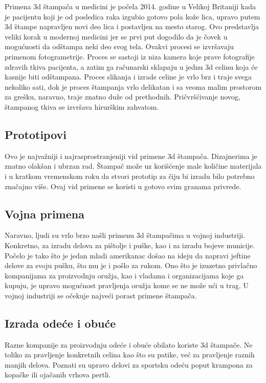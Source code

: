 \documentclass[a4paper]{article}
\begin{document}
{Primena 3d štampača u medicini je počela 2014. godine u Velikoj Britaniji kada je pacijentu koji je od posledica raka izgubio gotovo pola kože lica, upravo putem 3d štampe napravljen novi deo lica i postavljen na mesto starog. Ovo predstavlja veliki korak u modernoj medicini jer se prvi put dogodilo da je čovek u mogućnosti da odštampa neki deo svog tela. 
\bigbreak Ovakvi procesi se izvršavaju primenom fotogrametrije. Proces se sastoji iz niza kamera koje prave fotografije zdravih tkiva pacijenta, a zatim ga računarski sklapaju u jednu 3d celinu koja će kasnije biti odštampana. Proces slikanja i izrade celine je vrlo brz i traje svega nekoliko sati, dok je proces štampanja vrlo delikatan i sa veoma malim prostorom za grešku, naravno, traje znatno duže od prethodnih. Pričvršćivanje novog, štampanog tkiva se izvršava hirurškim zahvatom.

\subsection{Prototipovi}
\label{subsec:podnaslov7}

Ovo je najvažniji i najrasprostranjeniji vid primene 3d štampača. Dizajnerima je znatno olakšan i ubrzan rad. Štampač može uz korišćenje male količine materijala i u kratkom vremenskom roku da stvori prototip za čiju bi izradu bilo potrebno značajno više. Ovaj vid primene se koristi u gotovo svim granama privrede.

\subsection{Vojna primena}
\label{subsec:podnaslov8}

Naravno, ljudi su vrlo brzo našli primenu 3d štampačima u vojnoj industriji. Konkretno, za izradu delova za pištolje i puške, kao i za izradu bojeve municije. Počelo je tako što je jedan mladi amerikanac došao na ideju da napravi jeftine delove za svoju pušku, što mu je i pošlo za rukom. Ono što je izuzetno privlačno kompanijama za proizvodnju oružja, kao i vladama i organizacijama koje ga kupuju, je upravo mogućnost pravljenja oružja kome se ne može ući u trag. U vojnoj industriji se očekuje najveći porast primene štampača. 

\subsection{Izrada odeće i obuće}
\label{subsec:podnaslov9}

Razne kompanije za proizvodnju odeće i obuće obilato koriste 3d štampače. Ne toliko za pravljenje konkretnih celina kao što su patike, već za pravljenje raznih manjih delova. Poznati su upravo delovi za sportsku odeću poput krampona za kopačke ili ojačanih vrhova pertli.

}
\end{document}

